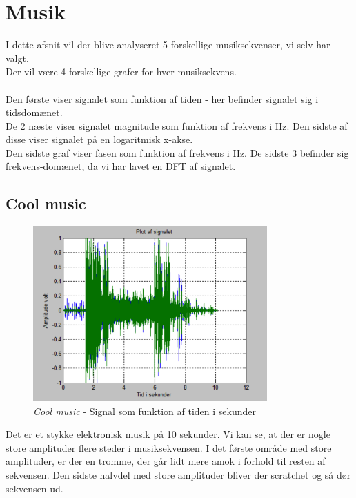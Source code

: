 \chapter{Musik}
I dette afsnit vil der blive analyseret 5 forskellige musiksekvenser, vi selv har valgt. \\
Der vil være 4 forskellige grafer for hver musiksekvens.\\ \\
Den første viser signalet som funktion af tiden - her befinder signalet sig i tidsdomænet. \\
De 2 næste viser signalet magnitude som funktion af frekvens i Hz. Den sidste af disse viser signalet på en logaritmisk x-akse. \\
Den sidste graf viser fasen som funktion af frekvens i Hz. De sidste 3 befinder sig frekvens-domænet, da vi har lavet en DFT af signalet.   

\section{Cool music}

\begin{figure}[H]
	\centering
	\includegraphics[width=0.8\textwidth]{Figurer/Snip20151001_3}
	\caption{\textit{Cool music} - Signal som funktion af tiden i sekunder}
\end{figure}

Det er et stykke elektronisk musik på 10 sekunder. Vi kan se, at der er nogle store amplituder flere steder i musiksekvensen. I det første område med store amplituder, er der en tromme, der går lidt mere amok i forhold til resten af sekvensen. Den sidste halvdel med store amplituder bliver der scratchet og så dør sekvensen ud.

